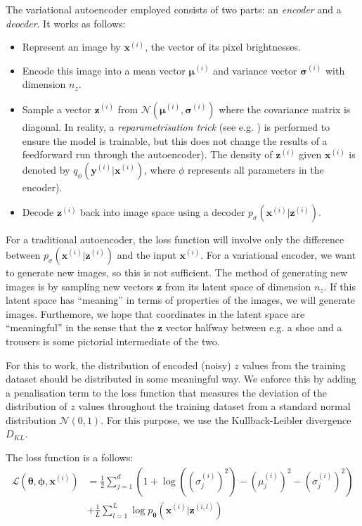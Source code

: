 \documentclass[]{article}
\begin{document}
The variational autoencoder employed consists of two parts: an \textit{encoder} and a \textit{deocder}. It works as follows:
\begin{itemize}
\item Represent an image by $\bm{x}^{(i)}$, the vector of its pixel brightnesses.
\item Encode this image into a mean vector $\bm{\mu}^{(i)}$ and variance vector $\bm{\sigma}^{(i)}$ with dimension $n_z$.
 \item Sample a vector $\bm{z}^{(i)}$ from $\mathcal{N}(\bm{\mu}^{(i)}, \bm{\sigma}^{(i)})$ where the covariance matrix is diagonal. In reality, a \textit{reparametrisation trick} (see e.g. \cite{notes}) is performed to ensure the model is trainable, but this does not change the results of a feedforward run through the autoencoder). The density of $\bm{z}^{(i)}$ given $\bm{x}^{(i)}$ is denoted by $q_{\phi}(\bm{y}^{(i)}|\bm{x}^{(i)})$, where $\phi$ represents all parameters in the encoder). 
 \item Decode $\bm{z}^{(i)}$ back into image space using a decoder $p_{\sigma}(\bm{x}^{(i)}|\bm{z}^{(i)})$. 
\end{itemize}

For a traditional autoencoder, the loss function will involve only the difference between $p_{\sigma}(\bm{x}^{(i)}|\bm{z}^{(i)})$ and the input $\bm{x}^{(i)}$. For a variational encoder, we want to generate new images, so this is not sufficient. The method of generating new images is by sampling new vectors $\bm{z}$ from its latent space of dimension $n_z$. If this latent space has ``meaning'' in terms of properties of the images, we will generate images. Furthemore, we hope that coordinates in the latent space are ``meaningful'' in the sense that the $\bm{z}$ vector halfway between e.g. a shoe and a trousers is some pictorial intermediate of the two.




For this to work, the distribution of encoded (noisy) $z$ values from the training dataset should be distributed in some meaningful way. We enforce this by adding a penalisation term to the loss function that measures the deviation of the distribution of $z$ values throughout the training dataset from a standard normal distribution $\mathcal{N}(0, 1)$. For this purpose, we use the Kullback-Leibler divergence $D_{KL}$.

The loss function is a follows:
\begin{align}
  \label{eq:loss}
  \mathcal{L}(\bm{\theta}, \bm{\phi}, \bm{x}^{(i)}) &= \frac{1}{2} \sum_{j=1}^d \left( 1 + \log{((\sigma_j^{(i)})^2)} - (\mu_j^{(i)})^2 - (\sigma_j^{(i)})^2 \right) \\
  &+ \frac{1}{L} \sum_{l=1}^L \log{p_{\bm{\theta}}(\bm{x}^{(i)}|\bm{z}^{(i, l)})}
\end{align}
\end{document}
